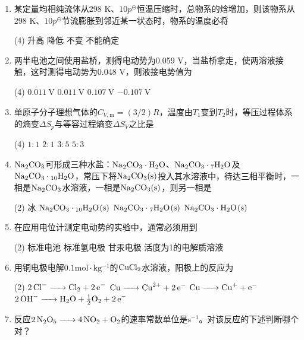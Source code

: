 \begin{enumerate}[label=\arabic*., itemsep=1.5ex]
    \item 某定量均相纯流体从298 K、$10p^\ominus$恒温压缩时，总物系的焓增加，则该物系从298 K、$10p^\ominus$节流膨胀到邻近某一状态时，物系的温度必将
    \begin{tasks}(4)
        \task 升高
        \task 降低
        \task 不变
        \task 不能确定
    \end{tasks}
    \item 两半电池之间使用盐桥，测得电动势为0.059 V，当盐桥拿走，使两溶液接触，这时测得电动势为0.048 V，则液接电势值为
    \begin{tasks}(4)
        \task $0.011\ \mathrm{V}$
        \task $0.011\ \mathrm{V}$
        \task $0.107\ \mathrm{V}$
        \task $-0.107\ \mathrm{V}$
    \end{tasks}
    \item 单原子分子理想气体的$C_{V,\mathrm{m}}=(3/2)R$，温度由$T_1$变到$T_2$时，等压过程体系的熵变$\Delta S_p$与等容过程熵变$\Delta S_V$之比是
    \begin{tasks}(4)
        \task $1:1$
        \task $2:1$
        \task $3:5$
        \task $5:3$
    \end{tasks}
    \item $\ce{Na2CO3}$可形成三种水盐：$\ce{Na2CO3\cdot H2O}$、$\ce{Na2CO3\cdot 7H2O}$及$\ce{Na2CO3\cdot 10H2O}$，常压下将$\ce{Na2CO3(s)}$投入其水溶液中，待达三相平衡时，一相是$\ce{Na2CO3}$水溶液，一相是$\ce{Na2CO3(s)}$，则另一相是
    \begin{tasks}(2)
        \task 冰
        \task $\ce{Na2CO3\cdot 10H2O(s)}$
        \task $\ce{Na2CO3\cdot 7H2O(s)}$
        \task $\ce{Na2CO3\cdot H2O(s)}$
    \end{tasks}
    \item 在应用电位计测定电动势的实验中，通常必须用到
    \begin{tasks}(2)
        \task 标准电池
        \task 标准氢电极
        \task 甘汞电极
        \task 活度为1的电解质溶液
    \end{tasks}
    \item 用铜电极电解$0.1\mathrm{mol\cdot kg^{-1}}$的$\ce{CuCl2}$水溶液，阳极上的反应为
    \begin{tasks}(2)
        \task $\ce{2Cl- -> Cl2 + 2e-}$
        \task $\ce{Cu -> Cu^{2+} + 2e-}$
        \task $\ce{Cu -> Cu+ + e-}$
        \task $\ce{2OH- -> H2O + \frac{1}{2}O2 + 2e-}$
    \end{tasks}
    \item 反应$\ce{2N2O5 -> 4NO2 + O2}$的速率常数单位是$\mathrm{s^{-1}}$。对该反应的下述判断哪个对？

\end{enumerate}
